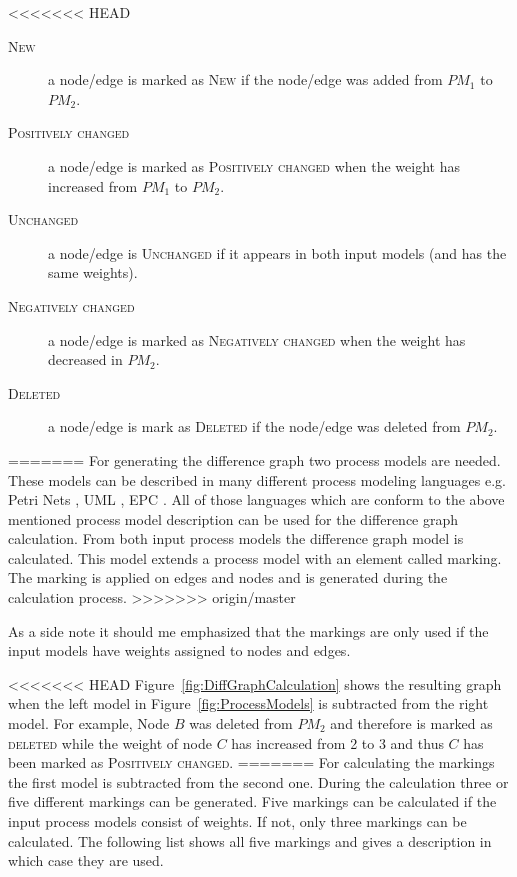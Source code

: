 \documentclass{llncs}
\begin{document}
\begin{keywords}
<<<<<<< HEAD
\begin{description}
	\item[\textsc{New}] a node/edge is marked as \textsc{New} if the node/edge was added from $PM_1$ to $PM_2$.
	\item[\textsc{Positively changed}] a node/edge is marked as \textsc{Positively changed} when the weight has increased from $PM_1$ to $PM_2$.
	\item[\textsc{Unchanged}] a node/edge is \textsc{Unchanged} if it appears in both input models (and has the same weights).
	\item[\textsc{Negatively changed}] a node/edge is marked as \textsc{Negatively changed} when the weight has decreased in $PM_2$.
	\item[\textsc{Deleted}] a node/edge is mark as \textsc{Deleted} if the node/edge was deleted from $PM_2$.
\end{description}
=======
For generating the difference graph two process models are needed. These models can be described in many different process modeling languages e.g. Petri Nets \cite{lit:Petrinet}, UML \cite{lit:UML}, EPC \cite{lit:EPC}. All of those languages which are conform to the above mentioned process model description can be used for the difference graph calculation. From both input process models the difference graph model is calculated. This model extends a process model with an element called marking. The marking is applied on edges and nodes and is generated during the calculation process.
>>>>>>> origin/master

As a side note it should me emphasized that the markings are only used if the input models have weights assigned to nodes and edges.

<<<<<<< HEAD
Figure~\ref{fig:DiffGraphCalculation} shows the resulting graph when the left model in Figure~\ref{fig:ProcessModels} is subtracted from the right model. For example, Node $B$ was deleted from $PM_2$ and therefore is marked as \textsc{deleted} while the weight of node $C$ has increased from 2 to 3 and thus $C$ has been marked as \textsc{Positively changed}. 
=======
For calculating the markings the first model is subtracted from the second one. During the calculation three or five different markings can be generated. Five markings can be calculated if the input process models consist of weights. If not, only three markings can be calculated. The following list shows all five markings and gives a description in which case they are used. 


\end{keywords}
\end{document}
